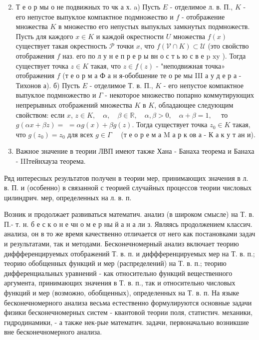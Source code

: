 \documentclass[10pt]{article}
\begin{document}
\begin{enumerate}

  \setcounter{enumi}{1}

  \item Т е о р мы о не подвижных то чк а х. a) Пусть $E$ - отделимое л. в. П., $K$ - его непустое выпуклое компактное подмножество и $f$ - отображение множества $K$ в множество его непустых выпуклых замкнутых подмножеств. Пусть для каждого $x \in K$ и каждой окрестности $U$ множества $f(x)$ существует такая окрестность $\mathscr{P}$ точки $x$, что $f(\mathscr{V} \cap K) \subset \mathcal{U}$ (это свойство отображения $f$ наз. его по л у н е п р е р ы вн о с т ь ю с в е p $\mathrm{x} \mathrm{y}$ ). Тогда существует точка $z \in K$ такая, что $z \in f(z)$ - "неподвижная точка» отображения $f$ (т е о р м а Ф а н я-обобшение те о ре мы III а у д е р а - Тихонов а). б) Пусть $E$ - отделимое Т. в. П., $K$ - его непустое компактное выпуклое подмножество и $\Gamma$ - некоторое множество попарно коммутирующих непрерывных отображений множества $K$ в $K$, обладающее следующим свойством: если $x$, $z \in K, \quad \alpha, \quad \beta \in \mathbb{R}, \quad \alpha, \beta>0, \quad \alpha+\beta=1, \quad$ то $g(\alpha x+\beta z)=$ $=\alpha g(x)+\beta g(z)$. Тогда существует точка $z_{0} \in K$ такая, что $g\left(z_{0}\right)=z_{0}$ для всех $g \in \Gamma \quad$ (т е о р е м а M а р к ов а - К а к у т ан и).



  \item Важное значение в теории ЛВП имеют также Хана - Банаха теорема и Банаха - IIIтейнхауза теорема.



\end{enumerate}



Ряд интересных результатов получен в теории мер, принимающих значения в л. в. П. и (особенно) в связанной с теорией случайных процессов теории числовых цилиндрич. мер, определенных на л. в. п.



Возник и продолжает развиваться математич. анализ (в широком смысле) на Т. в. П.- т. н. б е с к о н е чн о м е р ны й а н а ли з. Являясь продолжением классич. анализа, он в то же время качественно отличается от него как постановками задач и результатами, так и методами. Бесконечномерный анализ включает теорию диффференцируемых отображений Т. в. п. и диффференцируемых мер на Т. в. п.; теорию обобщенных функций и мер (распределений) на Т. в. п.; теорию дифференциальных уравнений - как относительно функций вещественного аргумента, принимающих значения в Т. в. п., так и относительно числовых функций и мер (возможно, обобщенных), определенных на Т. в. п. На языке бесконечномерного анализа весьма естественно формулируются основные задачи физики бесконечномерных систем - квантовой теории поля, статистич. механики, гидродинамики, - а также нек-рые математич. задачи, первоначально возникшие вне бесконечномерного анализа.
\end{document}
